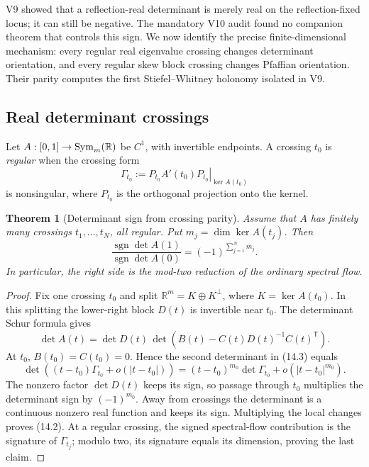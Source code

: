 \documentclass[11pt]{article}
\newtheorem{theorem}{Theorem}[section]
\theoremstyle{remark}
\begin{document}
V9 showed that a reflection-real determinant is merely real on the
reflection-fixed locus; it can still be negative.  The mandatory V10 audit
found no companion theorem that controls this sign.  We now identify the
precise finite-dimensional mechanism: every regular real eigenvalue
crossing changes determinant orientation, and every regular skew block
crossing changes Pfaffian orientation.  Their parity computes the
first Stiefel--Whitney holonomy isolated in V9.

\subsection{Real determinant crossings}

Let \(A:[0,1]\to{\rm Sym}_m(\mathbb R)\) be \(C^1\), with invertible
endpoints.  A crossing \(t_0\) is \emph{regular} when the crossing form
\[
 \Gamma_{t_0}:=\left.P_{t_0}A'(t_0)P_{t_0}\right|_{\ker A(t_0)}
                                                               \tag{14.1}
\]
is nonsingular, where \(P_{t_0}\) is the orthogonal projection onto the
kernel.

\begin{theorem}[Determinant sign from crossing parity]
\label{thm:v19v11-det-sign}
Assume that \(A\) has finitely many crossings \(t_1,\ldots,t_N\), all
regular.  Put \(m_j=\dim\ker A(t_j)\).  Then
\[
 \frac{\operatorname{sgn}\det A(1)}
      {\operatorname{sgn}\det A(0)}
 =(-1)^{\sum_{j=1}^N m_j}.                                    \tag{14.2}
\]
In particular, the right side is the mod-two reduction of the ordinary
spectral flow.
\end{theorem}

\begin{proof}
Fix one crossing \(t_0\) and split
\(\mathbb R^m=K\oplus K^\perp\), where \(K=\ker A(t_0)\).
In this splitting the lower-right block \(D(t)\) is invertible near
\(t_0\).  The determinant Schur formula gives
\[
 \det A(t)=\det D(t)\,
 \det\!\left(B(t)-C(t)D(t)^{-1}C(t)^{\mathsf T}\right).         \tag{14.3}
\]
At \(t_0\), \(B(t_0)=C(t_0)=0\).  Hence the second determinant in
(14.3) equals
\[
 \det\!\left((t-t_0)\Gamma_{t_0}+o(|t-t_0|)\right)
 =(t-t_0)^{m_0}\det\Gamma_{t_0}+o(|t-t_0|^{m_0}).              \tag{14.4}
\]
The nonzero factor \(\det D(t)\) keeps its sign, so passage through \(t_0\)
multiplies the determinant sign by \((-1)^{m_0}\).  Away from crossings
the determinant is a continuous nonzero real function and keeps its sign.
Multiplying the local changes proves (14.2).  At a regular crossing, the
signed spectral-flow contribution is the signature of \(\Gamma_{t_j}\);
modulo two, its signature equals its dimension, proving the last claim.
\end{proof}
\end{document}
